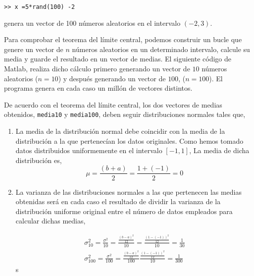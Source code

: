 \begin{verbatim}
>> x =5*rand(100) -2
\end{verbatim}
genera un vector de 100 números aleatorios en el intervalo $(-2,3)$.

Para comprobar el teorema del límite central, podemos construir un bucle que genere un vector de $n$ números aleatorios en un determinado intervalo, calcule su media y guarde el resultado en un vector de medias. El siguiente código de Matlab, realiza dicho cálculo primero generando un vector de $10$ números aleatorios ($n = 10$) y después generando un vector de $100$, ($n=100$).  El programa genera en cada caso un millón de vectores distintos.
%
%

De acuerdo con el teorema del límite central, los dos vectores de medias obtenidos, \texttt{media10} y \texttt{media100}, deben seguir distribuciones normales tales que,
\begin{enumerate}
\item La media de la distribución normal debe coincidir con la media de la distribución a la que pertenecían los datos originales. Como hemos tomado datos distribuidos uniformemente en el intervalo $[-1,1]$, La media de dicha distribución es,
\begin{equation*}
\mu = \frac{(b+a)}{2}=\frac{1+(-1)}{2}=0
\end{equation*}
\item La varianza de las distribuciones normales a las que pertenecen las medias obtenidas será en cada caso el resultado de dividir la varianza de la distribución uniforme original entre el número de datos empleados para calcular dichas medias,


\begin{align*}
\sigma_{10}^2 = \frac{\sigma^2}{10}=\frac{\frac{(b-a)^2}{12}}{10}=\frac{\frac{(1-(-1))^2}{12}}{10}=\frac{1}{30}\\
\sigma_{100}^2 = \frac{\sigma^2}{100}=\frac{\frac{(b-a)^2}{12}}{100}\frac{\frac{(1-(-1))^2}{12}}{10}=\frac{1}{300}
\end{align*}s
\end{enumerate}

